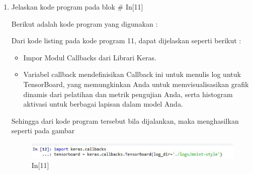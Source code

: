 \begin{enumerate}
\item Jelaskan kode program pada blok \# In[11]
\par Berikut adalah kode program yang digunakan :

\par Dari kode listing pada kode program 11, dapat dijelaskan seperti berikut :
\begin{itemize}
\item Impor Modul Callbacks dari Librari Keras.
\item Variabel callback mendefinisikan Callback ini untuk menulis log untuk TensorBoard, yang memungkinkan Anda untuk memvisualisasikan grafik dinamis dari pelatihan dan metrik pengujian Anda, serta histogram aktivasi untuk berbagai lapisan dalam model Anda.
\end{itemize}
\par Sehingga dari kode program tersebut bila dijalankan, maka menghasilkan seperti pada gambar 
\begin{figure}[!htbp]
	\centerline{\includegraphics[width=1\textwidth]{figures/andi/p11.PNG}}
	\caption{In[11]}
\end{figure}


\end{enumerate}
